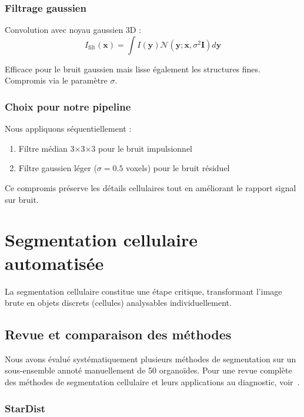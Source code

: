 \subsubsection{Filtrage gaussien}

Convolution avec noyau gaussien 3D :
\[
I_{\text{filt}}(\mathbf{x}) = \int I(\mathbf{y}) \mathcal{N}(\mathbf{y}; \mathbf{x}, \sigma^2 \mathbf{I}) d\mathbf{y}
\]

Efficace pour le bruit gaussien mais lisse également les structures fines. Compromis via le paramètre $\sigma$.

\subsubsection{Choix pour notre pipeline}

Nous appliquons séquentiellement :
\begin{enumerate}
    \item Filtre médian 3×3×3 pour le bruit impulsionnel
    \item Filtre gaussien léger ($\sigma = 0.5$ voxels) pour le bruit résiduel
\end{enumerate}

Ce compromis préserve les détails cellulaires tout en améliorant le rapport signal sur bruit.

\section{Segmentation cellulaire automatisée}

La segmentation cellulaire constitue une étape critique, transformant l'image brute en objets discrets (cellules) analysables individuellement.

\subsection{Revue et comparaison des méthodes}

Nous avons évalué systématiquement plusieurs méthodes de segmentation sur un sous-ensemble annoté manuellement de 50 organoïdes. Pour une revue complète des méthodes de segmentation cellulaire et leurs applications au diagnostic, voir~\cite{Nunes2024,Rayed2024,Wang2022Segmentation}.

\subsubsection{StarDist}

